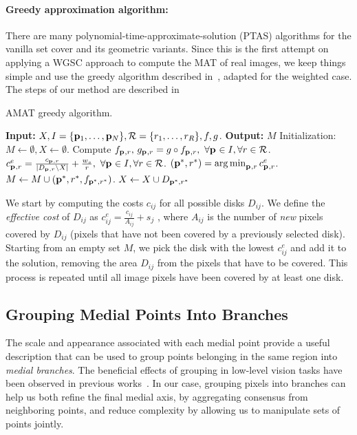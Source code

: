 \documentclass[10pt,twocolumn,letterpaper]{article}
\begin{document}
\paragraph{Greedy approximation algorithm:}
There are many polynomial-time-approximate-solution (PTAS) algorithms for the vanilla set cover
and its geometric variants.
Since this is the first attempt on applying a WGSC approach to compute the MAT of real images, we keep things simple
and use the greedy algorithm described in~\cite{vazirani2013approximation}, adapted for the weighted case.
The steps of our method are described in~
\begin{algorithm}[t]
\caption{AMAT greedy algorithm.}
\label{alg:greedy}
	\begin{algorithmic}[1]
	\Statex \textbf{Input:} $X,I=\{\mathbf{p}_{1},\ldots,\mathbf{p}_{N}\},\mathcal{R}=\{r_1,\ldots,r_R\},f,g$.
	\Statex \textbf{Output:} $M$
	\State Initialization: $M \leftarrow \emptyset,X \leftarrow \emptyset$.
	\State Compute $f_{\mathbf{p}_{},r},\, g_{\mathbf{p}_{},r} = g \circ f_{\mathbf{p}_{},r},\,\, \forall \mathbf{p}_{} \in I, \forall r \in \mathcal{R}$.
		\State $c_{\mathbf{p}_{},r}^e = \frac{c_{\mathbf{p}_{},r}}{|D_{\mathbf{p}_{},r} \setminus X|}+\frac{w_s}{r},\,\, \forall \mathbf{p}_{} \in I, \forall r \in \mathcal{R}$.
		\State $(\mathbf{p}_{}^{*},r^{*}) = \operatorname*{arg\,min}_{\mathbf{p}_{},r}{c_{\mathbf{p}_{},r}^e}$.		
		\State $M\leftarrow M\cup{(\mathbf{p}_{}^{*},r^{*},f_{\mathbf{p}_{}^{*},r^{*}})}$.
		\State $X \leftarrow X\cup D_{\mathbf{p}_{}^{*},r^{*}}$ 
	\EndWhile
	\end{algorithmic}
\end{algorithm}
We start by computing the costs $c_{ij}$ for all possible disks $D_{ij}$.
We define the \emph{effective cost} of $D_{ij}$ as $c_{ij}^e = \frac{c_{ij}}{A_{ij}} + s_j$ , where $A_{ij}$ is the number
of \emph{new} pixels covered by $D_{ij}$ (pixels that have not been covered by a previously selected disk).
Starting from an empty set $M$, we pick the disk with the lowest $c_{ij}^e$ and add it to the solution, 
removing the area $D_{ij}$ from the pixels that have to be covered.
This process is repeated until all image pixels have been covered by at least one disk.

\subsection{Grouping Medial Points Into Branches}\label{sec:method:grouping}
The scale and appearance associated with each medial point provide a useful
description that can be used to group points belonging in the same region into \emph{medial branches}.
The beneficial effects of grouping in low-level vision tasks have been
observed in previous works~\cite{felzenszwalb2006min,zhu2007untangling,kokkinos2010highly,qi2015making}.
In our case, grouping pixels into branches can help us both refine the final medial axis, 
by aggregating consensus from neighboring points, and reduce complexity 
by allowing us to manipulate sets of points jointly.
\end{document}
